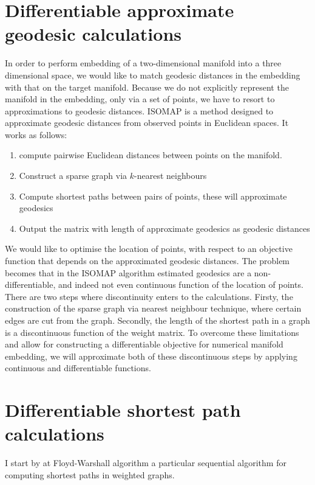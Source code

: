 \section{Differentiable approximate geodesic calculations}

In order to perform embedding of a two-dimensional manifold into a three dimensional space, we would like to match geodesic distances in the embedding with that on the target manifold. Because we do not explicitly represent the manifold in the embedding, only via a set of points, we have to resort to approximations to geodesic distances. ISOMAP \citep{Tenenbaum} is a method designed to approximate geodesic distances from observed points in Euclidean spaces. It works as follows:

\begin{enumerate}
	\item compute pairwise Euclidean distances between points on the manifold.
	\item Construct a sparse graph via $k$-nearest neighbours
	\item Compute shortest paths between pairs of points, these will approximate geodesics
	\item Output the matrix with length of approximate geodesics as geodesic distances
\end{enumerate}

We would like to optimise the location of points, with respect to an objective function that depends on the approximated geodesic distances. The problem becomes that in the ISOMAP algorithm estimated geodesics are a non-differentiable, and indeed not even continuous function of the location of points. There are two steps where discontinuity enters to the calculations. Firsty, the construction of the sparse graph via nearest neighbour technique, where certain edges are cut from the graph. Secondly, the length of the shortest path in a graph is a discontinuous function of the weight matrix. To overcome these limitations and allow for constructing a differentiable objective for numerical manifold embedding, we will approximate both of these discontinuous steps by applying continuous and differentiable functions.

\section{Differentiable shortest path calculations}

I start by  at Floyd-Warshall algorithm a particular sequential algorithm for computing shortest paths in weighted graphs.

